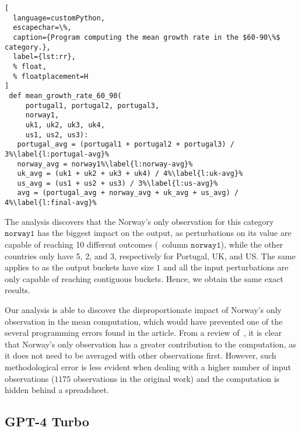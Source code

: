 \begin{lstlisting}[
  language=customPython,
  escapechar=\%,
  caption={Program computing the mean growth rate in the $60-90\%$ category.},
  label={lst:rr},
  % float,
  % floatplacement=H
]
 def mean_growth_rate_60_90(
     portugal1, portugal2, portugal3,
     norway1,
     uk1, uk2, uk3, uk4,
     us1, us2, us3):
   portugal_avg = (portugal1 + portugal2 + portugal3) / 3%\label{l:portugal-avg}%
   norway_avg = norway1%\label{l:norway-avg}%
   uk_avg = (uk1 + uk2 + uk3 + uk4) / 4%\label{l:uk-avg}%
   us_avg = (us1 + us2 + us3) / 3%\label{l:us-avg}%
   avg = (portugal_avg + norway_avg + uk_avg + us_avg) / 4%\label{l:final-avg}%
\end{lstlisting}
%
%
The analysis discovers that the Norway's only observation for this category $\texttt{norway1}$ has the biggest impact on the output, as perturbations on its value are capable of reaching 10 different outcomes (\cf~column $\texttt{norway1}$), while the other countries only have 5, 2, and 3, respectively for Portugal, UK, and US.
The same applies to \rangename{} as the output buckets have size $1$ and all the input perturbations are only capable of reaching contiguous buckets. Hence, we obtain the same exact results.

Our analysis is able to discover the disproportionate impact of Norway's only observation in the mean computation, which would have prevented one of the several programming errors found in the article.
From a review of~, it is clear that Norway's only observation has a greater contribution to the computation,
as it does not need to be averaged with other observations first.
However, such methodological error is less evident when dealing with a higher number of input observations ($1175$ observations in the original work) and the computation is hidden behind a spreadsheet.



\subsection{GPT-4 Turbo}

